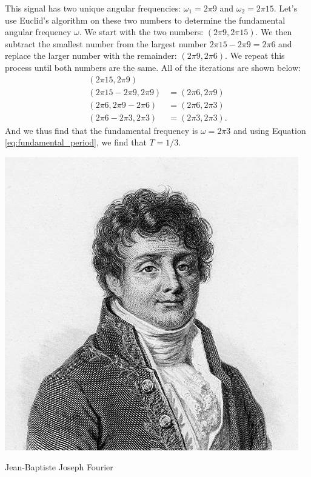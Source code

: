 This signal has two unique angular frequencies: $\omega_1 = 2\pi 9$ and $\omega_2 = 2\pi 15$. Let's use Euclid's algorithm on these two numbers to determine the fundamental angular frequency $\omega$. We start with the two numbers: $(2\pi 9, 2\pi15)$. We then subtract the smallest number from the largest number $2\pi 15 - 2\pi 9 = 2\pi 6$ and replace the larger number with the remainder: $(2\pi 9, 2\pi 6)$. We repeat this process until both numbers are the same. All of the iterations are shown below:
\begin{align*}
(2\pi 15, 2\pi 9) &\\
(2\pi 15-2\pi 9, 2\pi 9) &= (2\pi 6, 2\pi 9) \\
(2\pi 6, 2\pi 9-2\pi 6) &= (2\pi 6, 2\pi 3) \\
(2\pi 6-2\pi 3, 2\pi 3) &= (2\pi 3, 2\pi 3).
\end{align*}
And we thus find that the fundamental frequency is $\omega=2\pi 3$ and using Equation \ref{eq:fundamental_period}, we find that $T = 1/3$.

\begin{marginfigure}[1cm]
\begin{center}
  \includegraphics[width=\textwidth]{ch01/figures/fourier_head.jpg}
\end{center}
\caption{Jean-Baptiste Joseph Fourier}
\label{fig:joe_fourier2}
\end{marginfigure}

